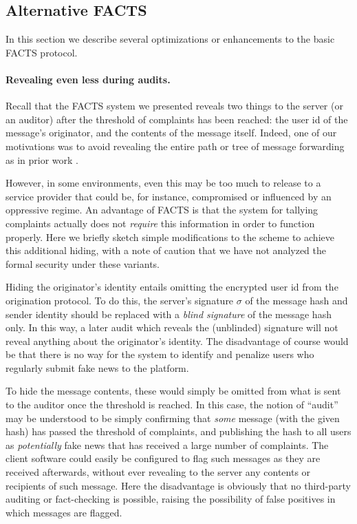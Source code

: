\subsection{Alternative FACTS} \label{sec:altFACTS}
In this section we describe several optimizations or enhancements to the basic FACTS protocol.

\paragraph{Revealing even less during audits.}
Recall that the FACTS system we presented reveals two things to the server (or an auditor) after the threshold of complaints has been reached: the user id of the message's originator, and the contents of the message itself. Indeed, one of our motivations was to avoid revealing the entire path or tree of message forwarding as in prior work \cite{CCS:TyaMieRis19}.

However, in some environments, even this may be too much to release to a service provider that could be, for instance, compromised or influenced by an oppressive regime. An advantage of FACTS is that the system for tallying complaints actually does not \emph{require} this information in order to function properly. Here we briefly sketch simple modifications to the scheme to achieve this additional hiding, with a note of caution that we have not analyzed the formal security under these variants.

Hiding the originator's identity entails omitting the encrypted user id from the origination protocol. To do this, the server's signature $\sigma$ of the message hash and sender identity should be replaced with a \emph{blind signature} of the message hash only. In this way, a later audit which reveals the (unblinded) signature will not reveal anything about the originator's identity. The disadvantage of course would be that there is no way for the system to identify and penalize users who regularly submit fake news to the platform.

To hide the message contents, these would simply be omitted from what is sent to the auditor once the threshold is reached. In this case, the notion of ``audit'' may be understood to be simply confirming that \emph{some} message (with the given hash) has passed the threshold of complaints, and publishing the hash to all users as \emph{potentially} fake news that has received a large number of complaints. The client software could easily be configured to flag such messages as they are received afterwards, without ever revealing to the server any contents or recipients of such message. Here the disadvantage is obviously that no third-party auditing or fact-checking is possible, raising the possibility of false positives in which messages are flagged.

